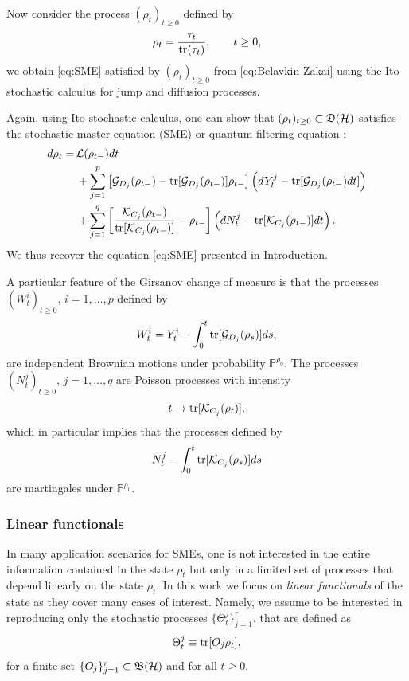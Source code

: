 \documentclass[aihp,12pt]{imsart}
\begin{document}
Now consider the process $(\rho_t)_{t\geq0}$ defined by 
$$\rho_t=\frac{\tau_t}{{\rm tr}(\tau_t)},\qquad t\geq0,$$ we obtain \eqref{eq:SME} satisfied by $(\rho_t)_{t\geq0}$ from \eqref{eq:Belavkin-Zakai}
using the Ito stochastic calculus for jump and diffusion processes.

Again, using Ito stochastic calculus, one can show that $(\rho_t)_{t\geq0}\subset\mathfrak{D}(\mathcal{H})$ satisfies the stochastic master equation (SME) \cite{barchielli2009quantum,bouten2007introduction} or quantum filtering equation \cite{BELAVKIN1992171}:
\begin{equation}
    \begin{split}
        d\rho_t =\,& \mathcal{L}(\rho_{t-}) dt\\& + \sum_{j=1}^{p} \left[ \mathcal{G}_{D_j}(\rho_{t-}) -{\rm tr}[\mathcal{G}_{D_j}(\rho_{t-})]\rho_{t-} \right] \left(dY_t^j-{\rm tr}[\mathcal{G}_{D_j}(\rho_{t-})dt]\right)\\&  + \sum_{j=1}^{q}\left[\frac{\mathcal{K}_{C_j}(\rho_{t-})}{{\rm tr}[\mathcal{K}_{C_j}(\rho_{t-})]}-\rho_{t-}\right]\left(dN_t^j-{\rm tr}[\mathcal{K}_{C_j}(\rho_{t-})]dt\right).
    \end{split}
    \label{eq:SME_2}
\end{equation}
We thus recover the equation \eqref{eq:SME} presented in Introduction. 

A particular feature of the Girsanov change of measure is that the processes $(W_t^i)_{t\geq0}$, $i=1,\ldots,p$ defined by
$$W_t^i = Y_t^i-\int_0^t{\rm tr}[\mathcal{G}_{D_j}(\rho_s)]ds,$$
are independent Brownian motions under probability $\mathbb P^{\rho_0}$. The processes $(N_t^j)_{t\geq0}$, $j=1,\ldots,q$ are Poisson processes with intensity
$$t\rightarrow {\rm tr}[\mathcal{K}_{C_j}(\rho_t)],$$ which in particular implies that the processes defined by
$$N_t^j-\int_0^t{\rm tr}[\mathcal{K}_{C_j}(\rho_s)]ds$$ are martingales under $\mathbb P^{\rho_0}.$

\subsubsection{Linear functionals}

In many application scenarios for SMEs, one is not interested in the entire information contained in the state $\rho_t$ but only in a limited set of processes that depend linearly on the state $\rho_t$. In this work we focus on \textit{linear functionals} of the state as they cover many cases of interest. Namely, we assume to be interested in reproducing only the stochastic processes $\{\Theta_t^j\}_{j=1}^r$, that are defined as 
\begin{equation}
    \Theta_t^j \equiv {\rm tr}[O_j\rho_t],
    \label{eq:output}
\end{equation} for a finite set $\{O_j\}_{j=1}^r\subset\mathfrak{B}(\mathcal{H})$ and for all $t\geq0$. 
\end{document}
